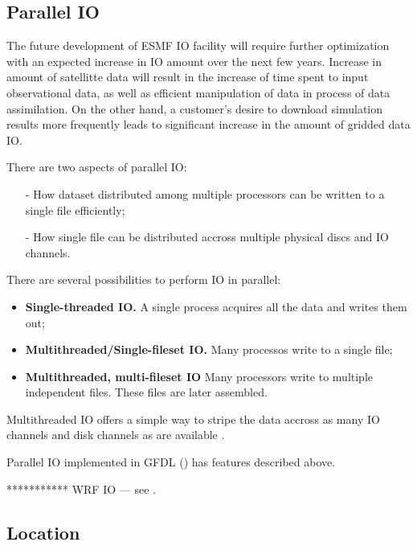 \subsection{Parallel IO}

The future development of ESMF IO facility will require further
optimization with an expected increase in IO amount over the next few
years. Increase in amount of satellitte data will result in the
increase of time spent to input observational data, as well as
efficient manipulation of data in process of data assimilation. On the
other hand, a customer's desire to download simulation results more 
frequently leads to significant increase in the amount of gridded data IO.

There are two aspects of  parallel IO:

\begin{itemize}
\item[-] How dataset distributed among multiple processors can be
written to a single file efficiently;

\item[-] How single file can be distributed accross multiple physical
discs and IO channels.
\end{itemize}
 
There are several possibilities to perform IO in parallel:
\begin{itemize}
\item {\bf Single-threaded IO.} A single process acquires all the data and
                                writes them out; 
\item {\bf Multithreaded/Single-fileset IO.} Many processos write to a
single file;

\item {\bf Multithreaded, multi-fileset IO} Many processors write to
multiple independent files. These files are later assembled. 
\end{itemize}

Multithreaded IO offers a simple way to stripe the data accross as many
IO channels and disk channels as are available \cite{
Balaji_Parallel_IO_1999, Balaji_Parallel_IO_2000}.

Parallel IO implemented in GFDL (\cite{mpp_io}) has features described
above.



*********** WRF IO --- see \cite{WRF-Software}.


\subsection{Location}

